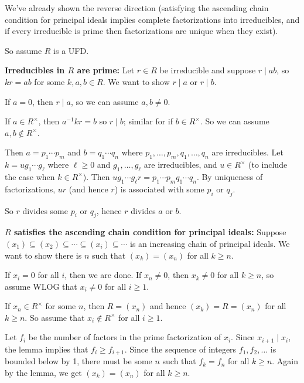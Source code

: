 \documentclass[12pt,letterpaper]{report}
\begin{document}
\begin{thmproof}
  We've already shown the reverse direction (satisfying the ascending chain condition for principal
  ideals implies complete factorizations into irreducibles, and if every irreducible is prime then
  factorizations are unique when they exist).

  So assume $R$ is a UFD.

  \textbf{Irreducibles in $R$ are prime:}
  Let $r \in R$ be irreducible and suppose $r \mid ab$, so $kr = ab$ for some $k, a, b \in R$.
  We want to show $r \mid a$ or $r \mid b$.

  If $a = 0$, then $r \mid a$, so we can assume $a, b \neq 0$.

  If $a \in R^\times$, then $a^{-1}kr = b$ so $r \mid b$; similar for if $b \in R^\times$.
  So we can assume $a, b \not\in R^\times$.

  Then $a = p_1 \cdots p_m$ and $b = q_1 \cdots q_n$ where $p_1, \ldots, p_m, q_1, \ldots, q_n$
  are irreducibles.
  Let $k = ug_1 \cdots g_\ell$ where $\ell \geq 0$ and $g_1, \ldots, g_\ell$ are irreducibles, and
  $u \in R^\times$ (to include the case when $k \in R^\times$).
  Then $ug_1 \cdots g_\ell r = p_1 \cdots p_m q_1 \cdots q_n$.
  By uniqueness of factorizations, $ur$ (and hence $r$) is associated with some $p_i$ or $q_j$.

  So $r$ divides some $p_i$ or $q_j$, hence $r$ divides $a$ or $b$.

  \textbf{$R$ satisfies the ascending chain condition for principal ideals:}
  Suppose $(x_1) \subseteq (x_2) \subseteq \cdots \subseteq (x_i) \subseteq \cdots$ is an
  increasing chain of principal ideals.
  We want to show there is $n$ such that $(x_k) = (x_n)$ for all $k \geq n$.

  If $x_i = 0$ for all $i$, then we are done.
  If $x_n \neq 0$, then $x_k \neq 0$ for all $k \geq n$, so assume WLOG that $x_i \neq 0$ for all
  $i \geq 1$.

  If $x_n \in R^\times$ for some $n$, then $R = (x_n)$ and hence $(x_k) = R = (x_n)$ for all
  $k \geq n$.
  So assume that $x_i \not\in R^\times$ for all $i \geq 1$.

  Let $f_i$ be the number of factors in the prime factorization of $x_i$.
  Since $x_{i + 1} \mid x_i$, the lemma implies that $f_i \geq f_{i + 1}$.
  Since the sequence of integers $f_1, f_2, \ldots$ is bounded below by 1, there must be some
  $n$ such that $f_k = f_n$ for all $k \geq n$.
  Again by the lemma, we get $(x_k) = (x_n)$ for all $k \geq n$.
\end{thmproof}
\end{document}
